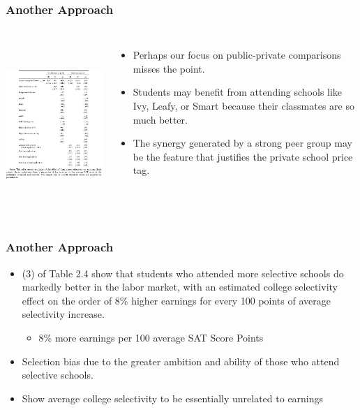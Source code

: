 \documentclass{beamer}
\begin{document}
\begin{frame}
\frametitle{Another Approach}
\begin{columns}
\includegraphics[width=8cm,height=6.5cm,keepaspectratio]{Table 2.4} 

\begin{itemize}
	\item Perhaps our focus on public-private comparisons misses the point. 
	\item Students may benefit from attending schools like Ivy, Leafy, or Smart because their classmates are so much better. 
	\item The synergy generated by a strong peer group may be the feature that justifies the private school price tag.
\end{itemize}

\end{columns}
\end{frame}
\begin{frame}
\frametitle{Another Approach}
\begin{itemize}
	\item (3) of Table 2.4 show that students who attended more selective schools do markedly better in the labor market, with an estimated college selectivity effect on the order of 8\% higher earnings for every 100 points of average selectivity increase. 
		\begin{itemize}
			\item[\rightarrow] 8\% more earnings per 100 average SAT Score Points
		\end{itemize}
	\item Selection bias due to the greater ambition and ability of those who attend selective schools.
	\item Show average college selectivity to be essentially unrelated to earnings
\end{itemize}

\end{frame}
\end{document}
